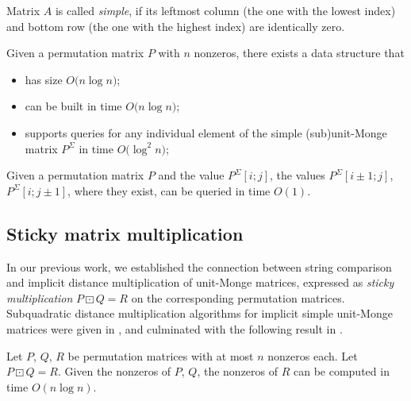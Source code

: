 \documentclass[a4paper,UKenglish,cleveref]{lipics-v2021}
\newcommand{\bigpa}[1]{\bigl(#1\bigr)}
\begin{document}
\begin{definition}
\label{def-simple}
%
Matrix $A$ is called \emph{simple},
if its leftmost column (the one with the lowest index) 
and bottom row (the one with the highest index) are identically zero.
%
\end{definition}

\begin{theorem}
\label{th-umonge-matrix-query}
%
Given a permutation matrix $P$ with $n$ nonzeros, 
there exists a data structure that
%
\begin{itemize}
%
\item has size $O\bigpa{n \log n}$;
\item can be built in time $O\bigpa{n \log n}$;
%
\item supports queries for any individual element 
of the simple (sub)unit-Monge matrix $P^\Sigma$ in time $O\bigpa{\log^2 n}$;
%
\end{itemize}
%
\end{theorem}

\begin{theorem}
\label{th-umonge-matrix-query-inc}
%
Given a permutation matrix $P$ and the value $P^\Sigma[i;j]$,
the values $P^\Sigma[i \pm 1;j]$, $P^\Sigma[i;j \pm 1]$,
where they exist, can be queried in time $O(1)$.
%
\end{theorem}

\subsection{Sticky matrix multiplication}

In our previous work, we established the connection between string comparison
and implicit distance multiplication of unit-Monge matrices,
expressed as \emph{sticky multiplication} $P \boxdot Q = R$ 
on the corresponding permutation matrices.
%
Subquadratic distance multiplication algorithms 
for implicit simple unit-Monge matrices 
were given in \cite{Tiskin:06_CSR,Tiskin:08_MCS}, 
and culminated with the following result in \cite{Tiskin:15_Algorithmica}.
%
\begin{theorem}
\label{th-pmat-smult}
%
Let $P$, $Q$, $R$ be permutation matrices with at most $n$ nonzeros each.
Let $P \boxdot Q = R$.
Given the nonzeros of $P$, $Q$, the nonzeros of $R$ can be computed in time $O(n \log n)$.
%
\end{theorem}
\end{document}
